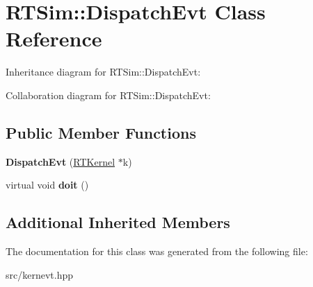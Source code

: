 \hypertarget{classRTSim_1_1DispatchEvt}{}\section{R\+T\+Sim\+:\+:Dispatch\+Evt Class Reference}
\label{classRTSim_1_1DispatchEvt}


Inheritance diagram for R\+T\+Sim\+:\+:Dispatch\+Evt\+:


Collaboration diagram for R\+T\+Sim\+:\+:Dispatch\+Evt\+:
\subsection*{Public Member Functions}
\begin{DoxyCompactItemize}
\item 
{\bfseries Dispatch\+Evt} (\hyperlink{classRTSim_1_1RTKernel}{R\+T\+Kernel} $\ast$k)\hypertarget{classRTSim_1_1DispatchEvt_a4fca0bfa3c951f73f2ab6894f9b43f6c}{}\label{classRTSim_1_1DispatchEvt_a4fca0bfa3c951f73f2ab6894f9b43f6c}

\item 
virtual void {\bfseries doit} ()\hypertarget{classRTSim_1_1DispatchEvt_a892ed7e6464ac0891183fdc89c62a72c}{}\label{classRTSim_1_1DispatchEvt_a892ed7e6464ac0891183fdc89c62a72c}

\end{DoxyCompactItemize}
\subsection*{Additional Inherited Members}


The documentation for this class was generated from the following file\+:\begin{DoxyCompactItemize}
\item 
src/kernevt.\+hpp\end{DoxyCompactItemize}
